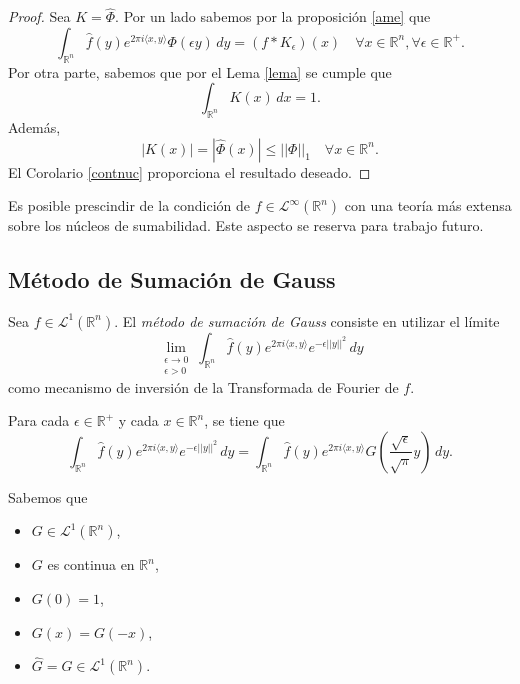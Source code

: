 \begin{proof}
Sea $K = \widehat{\Phi}$. Por un lado sabemos por la proposición \ref{ame}  que 
\begin{equation}\label{eq:c }
     \int_{\mathbb{R}^n}\widehat{f}(y)e^{2\pi i \langle x, y \rangle} \Phi(\epsilon y) \, dy  = (f*K_{\epsilon})(x) \quad \forall x \in \mathbb{R}^n, \forall \epsilon \in \mathbb{R}^+.
\end{equation}
\noindent Por otra parte, sabemos que por el Lema \ref{lema} se cumple que 
\begin{equation}
    \int_{\mathbb{R}^n} K(x) \, dx = 1.
\end{equation}
Además,
\begin{equation}
    |K(x)| = |\widehat{\Phi}(x)| \leq ||\Phi||_1 \quad \forall x \in \mathbb{R}^n.
\end{equation}
\noindent El Corolario \ref{contnuc} proporciona el resultado deseado.
\end{proof}
\begin{observacion}
   Es posible prescindir de la condición de $ f \in \mathscr{L}^{\infty}(\mathbb{R}^n)$ con una teoría más extensa sobre los núcleos de sumabilidad. Este aspecto se reserva para trabajo futuro.
\end{observacion}

\subsection{Método de Sumación de Gauss}

Sea $f \in \mathscr{L}^1(\mathbb{R}^n).$ El\textit{ método de sumación de Gauss} consiste en utilizar el límite
\begin{equation}
     \lim_{\substack{\epsilon \rightarrow 0 \\ \epsilon > 0}} \int_{\mathbb{R}^n}\widehat{f}(y)e^{2\pi i \langle x, y \rangle} e^{-\epsilon ||y|| ^2} \, dy
\end{equation}
como mecanismo de inversión de la Transformada de Fourier de $f$.

\noindent Para cada $\epsilon \in \mathbb{R}^+$ y cada  $x \in \mathbb{R}^n$, se tiene que
\begin{equation}
    \int_{\mathbb{R}^n}\widehat{f}(y)e^{2\pi i \langle x, y \rangle} e^{-\epsilon ||y|| ^2} \, dy = \int_{\mathbb{R}^n}\widehat{f}(y)e^{2\pi i \langle x, y \rangle} G\left(\frac{\sqrt{\epsilon}}{\sqrt{\pi}}y\right) \, dy. 
\end{equation}

\noindent Sabemos que 
\begin{itemize}
    \item $G \in \mathscr{L}^1(\mathbb{R}^n)$,
    \item $G$ es continua en $\mathbb{R}^n$,
    \item $G(0)=1$,
    \item $G(x)=G(-x)$,
    \item $\widehat{G}=G \in \mathscr{L}^1(\mathbb{R}^n)$.
\end{itemize}

